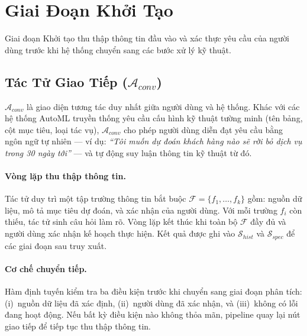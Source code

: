 \section{Giai Đoạn Khởi Tạo}

Giai đoạn Khởi tạo thu thập thông tin đầu vào và xác thực yêu cầu của người dùng trước khi hệ thống chuyển sang các bước xử lý kỹ thuật.

\subsection{Tác Tử Giao Tiếp ($\mathcal{A}_{conv}$)}

$\mathcal{A}_{conv}$ là giao diện tương tác duy nhất giữa người dùng và hệ thống. Khác với các hệ thống AutoML truyền thống yêu cầu cấu hình kỹ thuật tường minh (tên bảng, cột mục tiêu, loại tác vụ), $\mathcal{A}_{conv}$ cho phép người dùng diễn đạt yêu cầu bằng ngôn ngữ tự nhiên --- ví dụ: \textit{``Tôi muốn dự đoán khách hàng nào sẽ rời bỏ dịch vụ trong 30 ngày tới''} --- và tự động suy luận thông tin kỹ thuật từ đó.

\paragraph{Vòng lặp thu thập thông tin.}
Tác tử duy trì một tập trường thông tin bắt buộc $\mathcal{F} = \{f_1, \ldots, f_k\}$ gồm: nguồn dữ liệu, mô tả mục tiêu dự đoán, và xác nhận của người dùng. Với mỗi trường $f_i$ còn thiếu, tác tử sinh câu hỏi làm rõ. Vòng lặp kết thúc khi toàn bộ $\mathcal{F}$ đầy đủ và người dùng xác nhận kế hoạch thực hiện. Kết quả được ghi vào $\mathcal{S}_{hist}$ và $\mathcal{S}_{spec}$ để các giai đoạn sau truy xuất.

\paragraph{Cơ chế chuyển tiếp.}
Hàm định tuyến kiểm tra ba điều kiện trước khi chuyển sang giai đoạn phân tích: (i)~nguồn dữ liệu đã xác định, (ii)~người dùng đã xác nhận, và (iii)~không có lỗi đang hoạt động. Nếu bất kỳ điều kiện nào không thỏa mãn, pipeline quay lại nút giao tiếp để tiếp tục thu thập thông tin.
